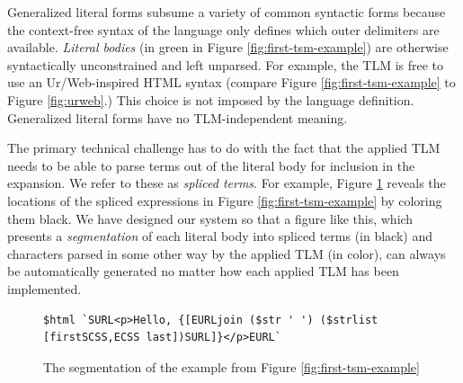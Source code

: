 Generalized literal forms subsume a variety of common syntactic forms because the context-free syntax of the language only defines which outer delimiters are available. \emph{Literal bodies} (in green in Figure \ref{fig:first-tsm-example}) are otherwise syntactically unconstrained and left unparsed. For example, the  TLM is free to use an Ur/Web-inspired HTML syntax (compare Figure \ref{fig:first-tsm-example} to Figure \ref{fig:urweb}.) This choice is not imposed by the language definition. Generalized literal forms have no TLM-independent meaning.


The primary technical challenge has to do with the fact that the applied TLM needs to be able to parse terms out of the literal body for inclusion in the expansion. We refer to these as \emph{spliced terms}. For example, Figure \ref{fig:first-tsm-example-marked} reveals the locations of the spliced expressions in Figure \ref{fig:first-tsm-example} by coloring them black. We have designed our system so that a figure like this, which presents a \emph{segmentation} of each literal body into spliced terms (in black) and characters parsed in some other way by the applied TLM (in color), can always be automatically generated no matter how each applied TLM has been implemented. 

\begin{figure}[h]
\begin{lstlisting}[numbers=none,xleftmargin=0px]
$html `SURL<p>Hello, {[EURLjoin ($str ' ') ($strlist [firstSCSS,ECSS last])SURL]}</p>EURL`
\end{lstlisting}
\caption{The segmentation of the example from Figure \ref{fig:first-tsm-example}}
\label{fig:first-tsm-example-marked}
\end{figure}

